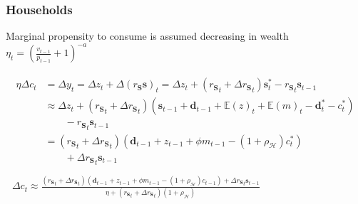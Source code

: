 \documentclass[]{beamer}
\begin{document}
\begin{frame}
	\frametitle{Households}
	Marginal propensity to consume is assumed decreasing in wealth $\eta_t = (\frac{v_{t-1}}{p_{t-1}} + 1)^{-a}$

	\begin{gather*}
		\begin{align*}
			\eta {\Delta c}_t & = {\Delta y}_t  = {\Delta z}_t + {\Delta (r_\mathbf{S} \mathbf{s})}_t   = {\Delta z}_t + ({r_\mathbf{S}}_t + {\Delta r_\mathbf{S}}_{t})\mathbf{s}^*_t - {r_\mathbf{S}}_{t} \mathbf{s}_{t-1} \\
			                  & \approx {\Delta z}_t   + ({r_\mathbf{S}}_t + {\Delta r_\mathbf{S}}_{t})(\mathbf{s}_{t-1} + \mathbf{d}_{t-1} + {\mathbb{E}(z)}_t + {\mathbb{E}(m)}_t - \mathbf{d}^*_t - c^*_t)               \\
			                  & \qquad - {r_\mathbf{S}}_{t} \mathbf{s}_{t-1}                                                                                                                                                \\
			                  & = ({r_\mathbf{S}}_t + {\Delta r_\mathbf{S}}_{t})(\mathbf{d}_{t-1} + z_{t-1} + \phi m_{t-1} - (1+\rho_{\mathcal{H}}) c^*_t)                                                                  \\
			                  & \qquad+ {\Delta r_\mathbf{S}}_{t} \mathbf{s}_{t-1}                                                                                                                                          \\
		\end{align*}\\
		{\Delta c}_t \approx \frac{({r_\mathbf{S}}_t + {\Delta r_\mathbf{S}}_{t})(\mathbf{d}_{t-1} + z_{t-1} + \phi m_{t-1} - (1+\rho_{\mathcal{H}}) c_{t-1}) + {\Delta r_\mathbf{S}}_{t} \mathbf{s}_{t-1}}{\eta +  ({r_\mathbf{S}}_t + {\Delta r_\mathbf{S}}_{t})(1+\rho_{\mathcal{H}})}
	\end{gather*}
\end{frame}
\end{document}
